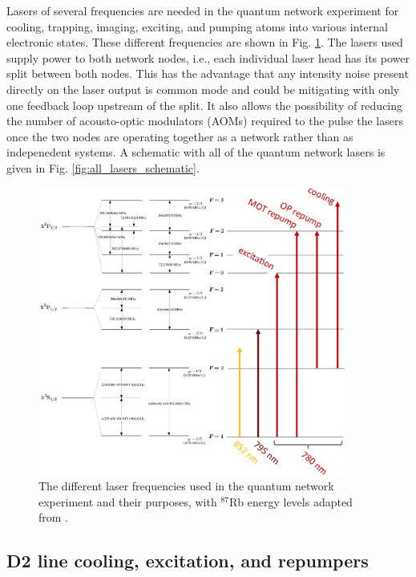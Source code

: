 Lasers of several frequencies are needed in the quantum network experiment for cooling, trapping, imaging, exciting, and pumping atoms into various internal electronic states. These different frequencies are shown in Fig. \ref{fig:laser_frequencies}. The lasers used supply power to both network nodes, i.e., each individual laser head has its power split between both nodes. This has the advantage that any intensity noise present directly on the laser output is common mode and could be mitigating with only one feedback loop upstream of the split. It also allows the possibility of reducing the number of acousto-optic modulators (AOMs) required to the pulse the lasers once the two nodes are operating together as a network rather than as indepenedent systems. A schematic with all of the quantum network lasers is given in Fig. \ref{fig:all_lasers_schematic}. 
\begin{figure}[h!]
    \centering
    \includegraphics[width=0.9\textwidth]{Images/laser_frequencies.pdf}
    \caption{The different laser frequencies used in the quantum network experiment and their purposes, with $^{87}$Rb energy levels adapted from \cite{steck2001rubidium}.}
    \label{fig:laser_frequencies}
\end{figure}

\subsection{D2 line cooling, excitation, and repumpers}

